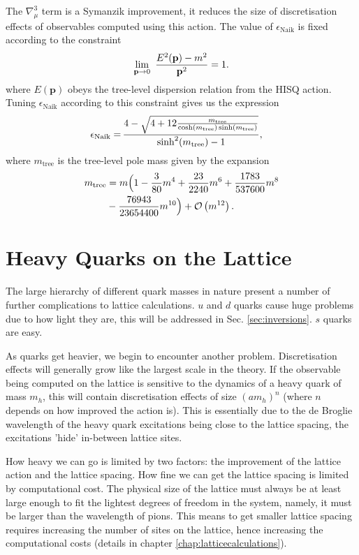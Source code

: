     The $\nabla^3_{\mu}$ term is a Symanzik improvement, it reduces the size of discretisation effects of observables computed using this action. The value of $\epsilon_{\text{Naik}}$ is fixed according to the constraint
    \begin{align}
      \lim_{{\textbf{p}}\to 0} \,\,{E^2({\textbf{p}})-m^2\over {\textbf{p}}^2} = 1.
    \end{align}
    where $E({\textbf{p}})$ obeys the tree-level dispersion relation from the HISQ action. Tuning $\epsilon_{\text{Naik}}$ according to this constraint gives us the expression \cite{Monahan:2012dq}
    \begin{align}
      \epsilon_{\text{Naik}} = \,&{ 4 - \sqrt{ 4 + 12 {m_{\text{tree}}\over \cosh(m_{\text{tree}}) \sinh(m_{\text{tree}})} } \over \sinh^2(m_{\text{tree}}) - 1 },
    \end{align}
    where $m_{\text{tree}}$ is the tree-level pole mass given by the expansion \cite{Follana:2006rc}
    \begin{align}
      m_{\text{tree}} &= m\Big( 1 - {3\over 80}m^4 + {23\over 2240}m^6 + {1783\over 537600 }m^8 \\ &- {76943\over 23654400} m^{10} \Big) + \mathcal{O}\left( m^{12} \right).
      \label{eq:hisq_tree_mass}
    \end{align}

    \section{Heavy Quarks on the Lattice}
    \label{sec:lattice_heavyquarks}

    The large hierarchy of different quark masses in nature present a number of further complications to lattice calculations. $u$ and $d$ quarks cause huge problems due to how light they are, this will be addressed in Sec. \ref{sec:inversions}. $s$ quarks are easy.

    As quarks get heavier, we begin to encounter another problem. Discretisation effects will generally grow like the largest scale in the theory. If the observable being computed on the lattice is sensitive to the dynamics of a heavy quark of mass $m_h$, this will contain discretisation effects of size $(am_h)^n$ (where $n$ depends on how improved the action is). This is essentially due to the de Broglie wavelength of the heavy quark excitations being close to the lattice spacing, the excitations 'hide' in-between lattice sites.

    How heavy we can go is limited by two factors: the improvement of the lattice action and the lattice spacing. How fine we can get the lattice spacing is limited by computational cost. The physical size of the lattice must always be at least large enough to fit the lightest degrees of freedom in the system, namely, it must be larger than the wavelength of pions. This means to get smaller lattice spacing requires increasing the number of sites on the lattice, hence increasing the computational costs (details in chapter \ref{chap:latticecalculations}).

